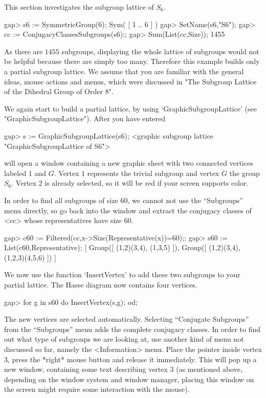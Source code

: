 
This section investigates the subgroup lattice of $S_6$.

\begintt
gap> s6 := SymmetricGroup(6);
Sym( [ 1 .. 6 ] )
gap> SetName(s6,"S6");
gap> cc := ConjugacyClassesSubgroups(s6);;
gap> Sum(List(cc,Size));
1455
\endtt

As there are $1455$ subgroups,  displaying  the whole lattice of  subgroups
would not  be helpful because  there are simply  too many.   Therefore this
example builds only a partial  subgroup lattice.   We  assume that you  are
familiar with  the  general ideas,  mouse   actions and  menus, which  were
discussed in "The Subgroup Lattice of the Dihedral Group of Order 8".

We again start to build a partial lattice, by using
`GraphicSubgroupLattice' (see "GraphicSubgroupLattice").  After you have
entered

\begintt
gap> s := GraphicSubgroupLattice(s6);
<graphic subgroup lattice "GraphicSubgroupLattice of S6">
\endtt

{\XGAP}  will open  a window  containing  a new  graphic  sheet with  two
connected vertices   labeled  $1$ and $G$.     Vertex  $1$ represents the
trivial subgroup and  vertex $G$ the group $S_6$.   Vertex $2$ is already
selected, so it will be red if your screen supports color.

In order  to  find all subgroups   of size $60$, we  cannot   not use the
``Subgroups'' menu directly, so go back into the  {\GAP} window and extract
the conjugacy classes of <cc> whose representatives have size $60$.

\begintt
gap> c60 := Filtered(cc,x->Size(Representative(x))=60);;
gap> s60 := List(c60,Representative);
[ Group([ (1,2)(3,4), (1,3,5) ]), Group([ (1,2)(3,4), (1,2,3)(4,5,6) ]) ]
\endtt

We now use the  function `InsertVertex'  to  add  these two subgroups  to your
partial lattice.  The Hasse diagram now contains four vertices.

\begintt
gap> for g in s60 do InsertVertex(s,g); od;
\endtt

The new vertices are selected automatically.  Selecting ``Conjugate
Subgroups'' from the ``Subgroups'' menu adds the complete conjugacy classes.
In order to find out what type of subgroups we  are looking at, use another
kind of menu not  discussed so far,  namely the <Information>  menu.  Place
the pointer inside  vertex $3$, press the  *right* mouse button and release
it immediately.  This  will  pop  up a new   window,  containing some  text
describing vertex $3$  (as mentioned above,  depending on the window system
and  window manager, placing this  window on the  screen might require some
interaction with the mouse).

